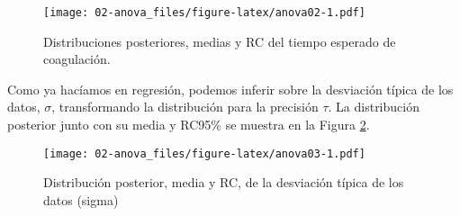 \documentclass[
]{book}
\newenvironment{Shaded}{\begin{snugshade}}{\end{snugshade}}
\newcommand{\AttributeTok}[1]{\textcolor[rgb]{0.77,0.63,0.00}{#1}}
\newcommand{\CommentTok}[1]{\textcolor[rgb]{0.56,0.35,0.01}{\textit{#1}}}
\newcommand{\ControlFlowTok}[1]{\textcolor[rgb]{0.13,0.29,0.53}{\textbf{#1}}}
\newcommand{\DecValTok}[1]{\textcolor[rgb]{0.00,0.00,0.81}{#1}}
\newcommand{\FloatTok}[1]{\textcolor[rgb]{0.00,0.00,0.81}{#1}}
\newcommand{\FunctionTok}[1]{\textcolor[rgb]{0.00,0.00,0.00}{#1}}
\newcommand{\NormalTok}[1]{#1}
\newcommand{\OtherTok}[1]{\textcolor[rgb]{0.56,0.35,0.01}{#1}}
\newcommand{\SpecialCharTok}[1]{\textcolor[rgb]{0.00,0.00,0.00}{#1}}
\newcommand{\StringTok}[1]{\textcolor[rgb]{0.31,0.60,0.02}{#1}}
\begin{document}
\begin{figure}
\centering
\texttt{[image: 02-anova\_files/figure-latex/anova02-1.pdf]}
\caption{\label{fig:anova02}Distribuciones posteriores, medias y RC del tiempo esperado de coagulación.}
\end{figure}

Como ya hacíamos en regresión, podemos inferir sobre la desviación típica de los datos, \(\sigma\), transformando la distribución para la precisión \(\tau\). La distribución posterior junto con su media y RC95\% se muestra en la Figura \ref{fig:anova03}.

\begin{Shaded}
\end{Shaded}

\begin{figure}
\centering
\texttt{[image: 02-anova\_files/figure-latex/anova03-1.pdf]}
\caption{\label{fig:anova03}Distribución posterior, media y RC, de la desviación típica de los datos (sigma)}
\end{figure}
\end{document}
